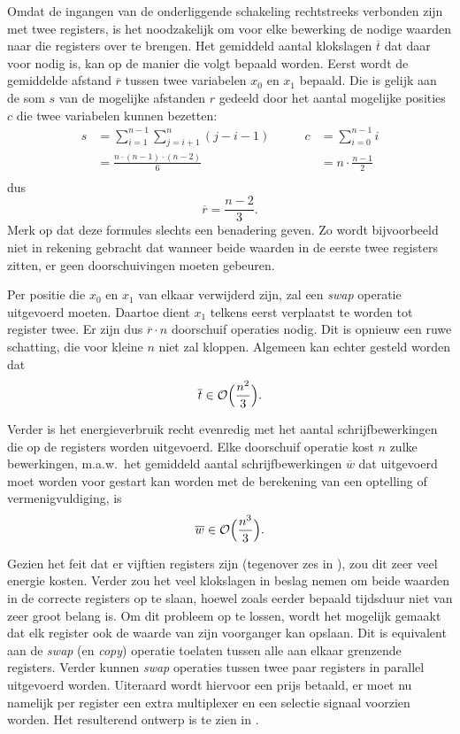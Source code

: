 Omdat de ingangen van de onderliggende schakeling rechtstreeks verbonden zijn met twee registers, is het noodzakelijk om voor elke bewerking de nodige waarden naar die registers over te brengen. Het gemiddeld aantal klokslagen $\overline{t}$ dat daar voor nodig is, kan op de manier die volgt bepaald worden. Eerst wordt de gemiddelde afstand $\overline{r}$ tussen twee variabelen $x_0$ en $x_1$ bepaald. Die is gelijk aan de som $s$ van de mogelijke afstanden $r$ gedeeld door het aantal mogelijke posities $c$ die twee variabelen kunnen bezetten:
\[\begin{aligned}
s	&= \sum_{i = 1}^{n - 1} \sum_{j = i + 1}^n (j - i - 1)
	&\qquad c	&= \sum_{i = 0}^{n - 1} i\\
	&= \frac{n \cdot (n - 1) \cdot (n - 2)}{6}
	&	&= n \cdot \frac{n - 1}{2}\\
\end{aligned}\]
dus
\[\overline{r}	= \frac{n - 2}{3}.\]
Merk op dat deze formules slechts een benadering geven. Zo wordt bijvoorbeeld niet in rekening gebracht dat wanneer beide waarden in de eerste twee registers zitten, er geen doorschuivingen moeten gebeuren.

Per positie die $x_0$ en $x_1$ van elkaar verwijderd zijn, zal een \emph{swap} operatie uitgevoerd moeten. Daartoe dient $x_1$ telkens eerst verplaatst te worden tot register twee. Er zijn dus $\overline{r} \cdot n$ doorschuif operaties nodig. Dit is opnieuw een ruwe schatting, die voor kleine $n$ niet zal kloppen. Algemeen kan echter gesteld worden dat
\[\overline{t} \in \mathcal{O} \Bigl( \frac{n^2}{3} \Bigr).\]

Verder is het energieverbruik recht evenredig met het aantal schrijfbewerkingen die op de registers worden uitgevoerd. Elke doorschuif operatie kost $n$ zulke bewerkingen, m.a.w.\ het gemiddeld aantal schrijfbewerkingen $\overline{w}$ dat uitgevoerd moet worden voor gestart kan worden met de berekening van een optelling of vermenigvuldiging, is
\[\overline{w} \in \mathcal{O} \Bigl( \frac{n^3}{3} \Bigr).\]

Gezien het feit dat er vijftien registers zijn (tegenover zes in \cite{lee}), zou dit zeer veel energie kosten. Verder zou het veel klokslagen in beslag nemen om beide waarden in de correcte registers op te slaan, hoewel zoals eerder bepaald tijdsduur niet van zeer groot belang is. Om dit probleem op te lossen, wordt het mogelijk gemaakt dat elk register ook de waarde van zijn voorganger kan opslaan. Dit is equivalent aan de \emph{swap} (en \emph{copy}) operatie toelaten tussen alle aan elkaar grenzende registers. Verder kunnen \emph{swap} operaties tussen twee paar registers in parallel uitgevoerd worden. Uiteraard wordt hiervoor een prijs betaald, er moet nu namelijk per register een extra multiplexer en een selectie signaal voorzien worden.  Het resulterend ontwerp is te zien in .

